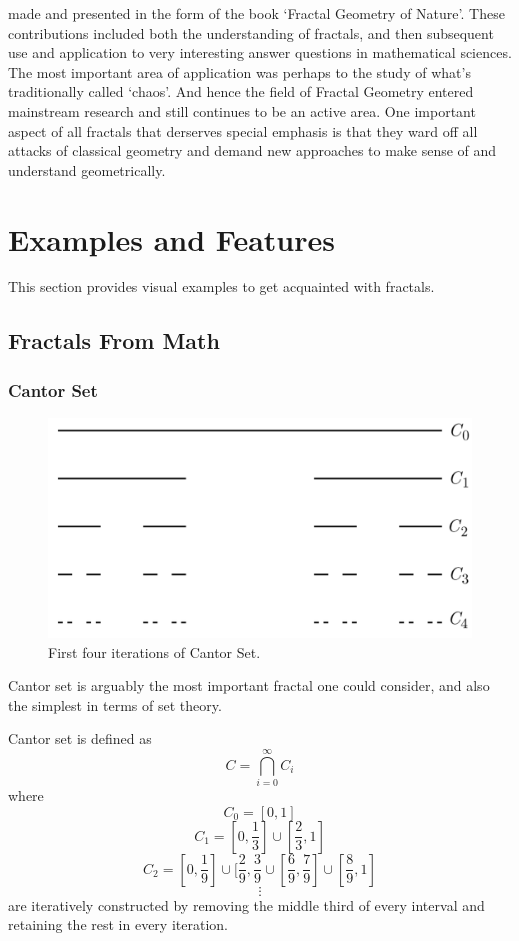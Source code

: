 made and presented in the form of the book `Fractal Geometry of Nature'. These
contributions included both the understanding of fractals, and then subsequent
use and application to very interesting answer questions in mathematical
sciences. The most important area of application was perhaps to the study of
what's traditionally called `chaos'. And hence the field of Fractal Geometry
entered mainstream research and still continues to be an active area.
\newline One important aspect of all fractals that derserves special emphasis is
that they ward off all attacks of classical geometry and demand new approaches
to make sense of and understand geometrically.\cite{mandelbrot}


\section{Examples and Features}
This section provides visual examples to get acquainted with fractals.
\subsection{Fractals From Math}
\subsubsection{Cantor Set}
\begin{figure}[h!]
    \includegraphics[width=\linewidth]{Pictures/cantor_set.png}
    \caption{First four iterations of Cantor Set.}
    \label{fig:cantor_set}
\end{figure}
Cantor set is arguably the most important fractal one could consider, and also
the simplest in terms of set theory. 
\begin{definition}
    Cantor set is defined as\cite{edgar}
    \[
        C = \bigcap_{i=0}^{\infty} C_i
    \]
    where  
    \[
        C_0 = [0,1]
    \]
    \[
        C_1 = [0,\frac{1}{3}] \cup [\frac{2}{3}, 1]
    \]
    \[
        C_2 = [0, \frac{1}{9}] \cup [\frac{2}{9}, \frac{3}{9} \cup
        [\frac{6}{9}, \frac{7}{9}] \cup [\frac{8}{9}, 1]
        \]
        \[
            \vdots
        \]
        are iteratively constructed by removing the middle third of every interval
        and retaining the rest in every iteration.
\end{definition}

